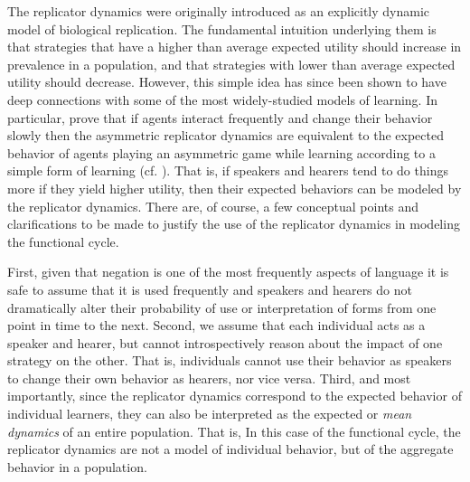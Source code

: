 \documentclass[linguex]{sp}
\theoremstyle{definition} \newtheorem{definition}{Definition}
\begin{document}



The replicator dynamics were originally introduced as an explicitly dynamic model of biological replication. The fundamental intuition underlying them is that strategies that have a higher than average expected utility should increase in prevalence in a population, and that strategies with lower than average expected utility should decrease. However, this simple idea has since been shown to have deep connections with some of the most widely-studied models of learning. In particular, \cite{borgers-sarin1997} prove that if agents interact frequently and change their behavior slowly then the asymmetric replicator dynamics are equivalent to the expected behavior of agents playing an asymmetric game while learning according to a simple form of learning (cf. \citealt{bush-mosteller1955, sutton-barto1998}). That is, if speakers and hearers tend to do things more if they yield higher utility, then their expected behaviors can be modeled by the replicator dynamics. There are, of course, a few conceptual points and clarifications to be made to justify the use of the replicator dynamics in modeling the functional cycle. 

First, given that negation is one of the most frequently aspects of language  it is safe to assume that it is used frequently and speakers and hearers do not dramatically alter their probability of use or interpretation of forms from one point in time to the next.  Second, we assume that each individual acts as a speaker and hearer, but cannot introspectively reason about the impact of one strategy on the other. That is, individuals cannot use their behavior as speakers to change their own behavior as hearers, nor vice versa. Third, and most importantly, since the replicator dynamics correspond to the expected behavior of individual learners, they can also be interpreted as the expected or \emph{mean dynamics} of an entire population. That is, 
 In this case of the functional cycle, the replicator dynamics are not a model of individual behavior, but of the aggregate behavior in a population.
\end{document}
